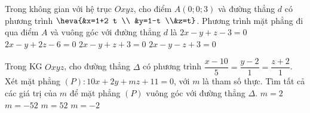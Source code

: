\begin{ex}%
	Trong không gian với hệ trục $Oxyz$, cho điểm $A(0;0;3)$ và đường thẳng $d$ có phương trình $ \heva{&x=1+2 t \\ &y=1-t \\&z=t}$. Phương trình mặt phẳng đi qua điểm $A$ và vuông góc với đường thẳng $d$ là
	\choice
		{\True $2x-y+z-3=0$}
		{$2x-y+2 z-6=0$}
		{$2x-y+z+3=0$}
		{$2x-y-z+3=0$}
\end{ex}

\begin{ex}%
	Trong KG $Oxyz$, cho đường thẳng $\Delta$ có phương trình $\dfrac{x-10}{5}=\dfrac{y-2}{1}=\dfrac{z+2}{1}$. Xét mặt phẳng $(P)\colon 10x+2y+m z+11=0$, với $m$ là tham số thực. Tìm tất cả các giá trị của $m$ để mặt phẳng $(P)$ vuông góc với đường thẳng $\Delta$.
	\choice 
		{\True $m=2$}
		{$m=-52$}
		{$m=52$}
		{$m=-2$}
\end{ex}

